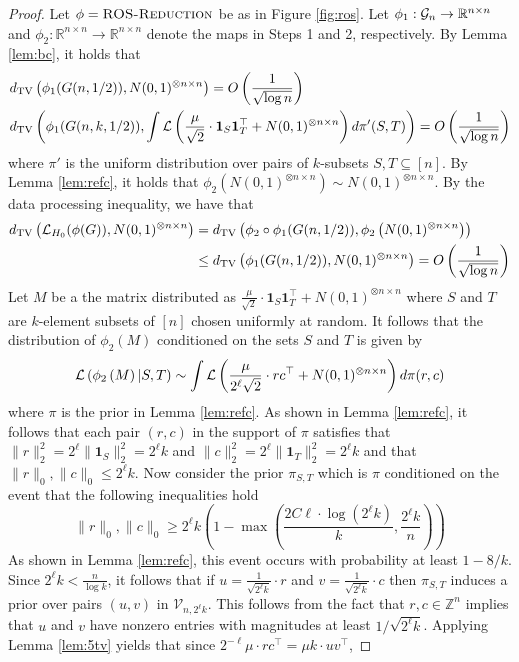 \begin{proof}
Let $\phi = \textsc{ROS-Reduction}$ be as in Figure \ref{fig:ros}. Let $\phi_1 : \mathcal{G}_n \to \mathbb{R}^{n \times n}$ and $\phi_2 : \mathbb{R}^{n \times n} \to \mathbb{R}^{n \times n}$ denote the maps in Steps 1 and 2, respectively. By Lemma \ref{lem:bc}, it holds that
\begin{align*}
&d_{\text{TV}}\left( \phi_1(G(n, 1/2)), N(0, 1)^{\otimes n \times n} \right) = O\left(\frac{1}{\sqrt{\log n}} \right) \\
&d_{\text{TV}}\left( \phi_1(G(n, k, 1/2)), \int \mathcal{L}\left(\frac{\mu}{\sqrt{2}} \cdot \mathbf{1}_S \mathbf{1}_T^\top + N(0, 1)^{\otimes n \times n} \right) d\pi'(S, T) \right) = O\left(\frac{1}{\sqrt{\log n}} \right) 
\end{align*}
where $\pi'$ is the uniform distribution over pairs of $k$-subsets $S, T \subseteq [n]$. By Lemma \ref{lem:refc}, it holds that $\phi_2\left( N(0, 1)^{\otimes n \times n} \right) \sim N(0, 1)^{\otimes n \times n}$. By the data processing inequality, we have that
\begin{align*}
d_{\text{TV}}\left( \mathcal{L}_{H_0}(\phi(G)), N(0, 1)^{\otimes n \times n} \right) &= d_{\text{TV}}\left( \phi_2 \circ \phi_1(G(n, 1/2)), \phi_2 \left( N(0, 1)^{\otimes n \times n} \right) \right) \\
&\le d_{\text{TV}}\left( \phi_1(G(n, 1/2)), N(0, 1)^{\otimes n \times n} \right) = O\left(\frac{1}{\sqrt{\log n}} \right)
\end{align*}
Let $M$ be a the matrix distributed as $\frac{\mu}{\sqrt{2}} \cdot \mathbf{1}_S \mathbf{1}_T^\top + N(0, 1)^{\otimes n \times n}$ where $S$ and $T$ are $k$-element subsets of $[n]$ chosen uniformly at random. It follows that the distribution of $\phi_2(M)$ conditioned on the sets $S$ and $T$ is given by
$$\mathcal{L}\left( \phi_2\left( M \right) | S, T \right) \sim \int \mathcal{L}\left( \frac{\mu}{2^\ell \sqrt{2}} \cdot rc^\top + N(0, 1)^{\otimes n \times n} \right) d\pi(r, c)$$
where $\pi$ is the prior in Lemma \ref{lem:refc}. As shown in Lemma \ref{lem:refc}, it follows that each pair $(r, c)$ in the support of $\pi$ satisfies that $\| r \|_2^2 = 2^\ell \| \mathbf{1}_S \|_2^2 = 2^\ell k$ and $\| c \|_2^2 = 2^\ell \| \mathbf{1}_T \|_2^2 = 2^\ell k$ and that $\| r \|_0, \| c \|_0 \le 2^\ell k$. Now consider the prior $\pi_{S, T}$ which is $\pi$ conditioned on the event that the following inequalities hold
$$\| r \|_0, \| c \|_0 \ge 2^\ell k \left( 1 - \max\left(\frac{2C\ell \cdot \log (2^\ell k)}{k}, \frac{2^\ell k}{n}\right) \right)$$
As shown in Lemma \ref{lem:refc}, this event occurs with probability at least $1 - 8/k$. Since $2^{\ell} k < \frac{n}{\log k}$, it follows that if $u = \frac{1}{\sqrt{2^\ell k}} \cdot r$ and $v = \frac{1}{\sqrt{2^\ell k}} \cdot c$ then $\pi_{S, T}$ induces a prior over pairs $(u, v)$ in $\mathcal{V}_{n, 2^\ell k}$. This follows from the fact that $r, c \in \mathbb{Z}^n$ implies that $u$ and $v$ have nonzero entries with magnitudes at least $1/\sqrt{2^\ell k}$. Applying Lemma \ref{lem:5tv} yields that since $2^{-\ell} \mu \cdot r c^\top = \mu k \cdot uv^\top$,

\end{proof}

